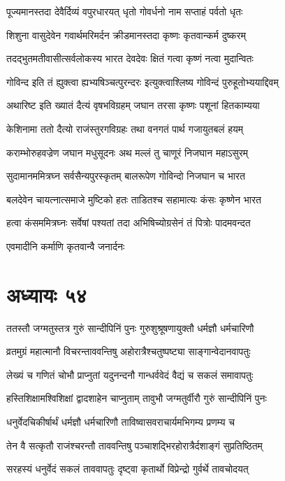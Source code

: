 \twolineshloka
{पूज्यमानस्तदा देवैर्दिव्यं वपुरधारयत्}
{धृतो गोवर्धनो नाम सप्ताहं पर्वतो धृतः}


\twolineshloka
{शिशुना वासुदेवेन गवार्थमरिमर्दन}
{क्रीडमानस्तदा कृष्णः कृतवान्कर्म दुष्करम्}


\threelineshloka
{तदद्भुतमतीवासीत्सर्वलोकस्य भारत}
{देवदेवः क्षितं गत्वा कृष्णं नत्वा मुदान्वितः}
{}


\twolineshloka
{गोविन्द इति तं ह्युक्त्वा ह्यभ्यषिञ्चत्पुरन्दरः}
{इत्युक्त्वाश्लिष्य गोविन्दं पुरुहूतोभ्ययाद्दिवम्}


\twolineshloka
{अथारिष्ट इति ख्यातं दैत्यं वृषभविग्रहम्}
{जघान तरसा कृष्णः पशूनां हितकाम्यया}


\twolineshloka
{केशिनामा ततो दैत्यो राजंस्तुरगविग्रहः}
{तथा वनगतं पार्थ गजायुतबलं हयम्}


\twolineshloka
{कराम्भोरुहवज्रेण जघान मधुसूदनः}
{अथ मल्लं तु चाणूरं निजघान महाऽसुरम्}


\twolineshloka
{सुदामानममित्रघ्न सर्वसैन्यपुरस्कृतम्}
{बालरूपेण गोविन्दो निजघान च भारत}


\twolineshloka
{बलदेवेन चायत्नात्समाजे मुष्टिको हतः}
{ताडितश्च सहामात्यः कंसः कृष्णेन भारत}


\threelineshloka
{हत्वा कंसममित्रघ्नः सर्वेषां पश्यतां तदा}
{अभिषिच्योग्रसेनं तं पित्रोः पादमवन्दत}
{}


एवमादीनि कर्माणि कृतवान्वै जनार्दनः
\chapter{अध्यायः ५४}
\twolineshloka
{ततस्तौ जग्मतुस्तत्र गुरुं सान्दीपिनिं पुनः}
{गुरुशुश्रूषणायुक्तौ धर्मज्ञौ धर्मचारिणौ}


\twolineshloka
{व्रतमुग्रं महात्मानौ विचरन्ताववन्तिषु}
{अहोरात्रैश्चतुष्पष्ट्या साङ्गान्वेदानवापतुः}


\twolineshloka
{लेख्यं च गणितं चोभौ प्राप्नुतां यदुनन्दनौ}
{गान्धर्ववेदं वैद्यं च सकलं समावापतुः}


\twolineshloka
{हस्तिशिक्षामश्विशिक्षां द्वादशाहेन चाप्नुताम्}
{तावुभौ जग्मतुर्वीरौ गुरुं सान्दीपिनिं पुनः}


\twolineshloka
{धनुर्वेदचिकीर्षार्थं धर्मज्ञौ धर्मचारिणौ}
{ताविष्वासवराचार्यमभिगम्य प्रणम्य च}


\twolineshloka
{तेन वै सत्कृतौ राजंश्चरन्तौ ताववन्तिषु}
{पञ्चाशद्भिरहोरात्रैर्दशाङ्गं सुप्रतिष्ठितम्}


\twolineshloka
{सरहस्यं धनुर्वेदं सकलं ताववापतुः}
{दृष्ट्वा कृतार्थो विप्रेन्द्रो गुर्वर्थे तावचोदयत्}



